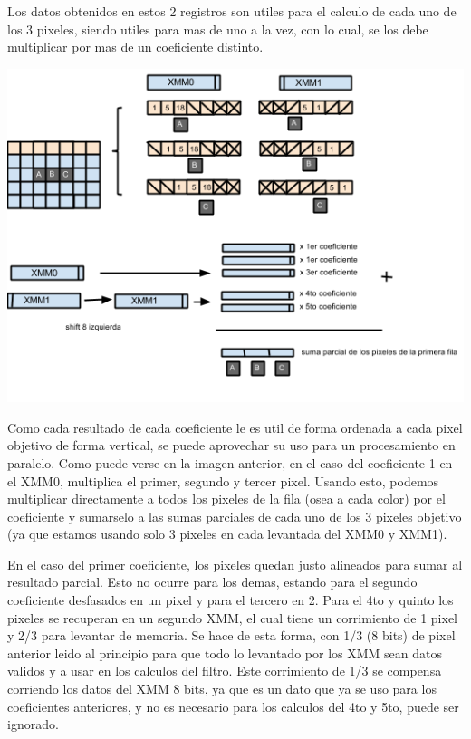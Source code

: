 Los datos obtenidos en estos 2 registros son utiles para el calculo de cada uno de los 3 pixeles, siendo utiles para mas de uno a la vez, con lo cual, se los debe multiplicar por mas de un coeficiente distinto.

\includegraphics[scale=0.8]{imagenes/mini-matriz-descomposicion.png}

Como cada resultado de cada coeficiente le es util de forma ordenada a cada pixel objetivo de forma vertical, se puede aprovechar su uso para un procesamiento en paralelo. Como puede verse en la imagen anterior, en el caso del coeficiente 1 en el XMM0, multiplica el primer, segundo y tercer pixel. Usando esto, podemos multiplicar directamente a todos los pixeles de la fila (osea a cada color) por el coeficiente y sumarselo a las sumas parciales de cada uno de los 3 pixeles objetivo (ya que estamos usando solo 3 pixeles en cada levantada del XMM0 y XMM1).

En el caso del primer coeficiente, los pixeles quedan justo alineados para sumar al resultado parcial. Esto no ocurre para los demas, estando para el segundo coeficiente desfasados en un pixel y para el tercero en 2. Para el 4to y quinto los pixeles se recuperan en un segundo XMM, el cual tiene un corrimiento de 1 pixel y 2/3 para levantar de memoria. Se hace de esta forma, con 1/3 (8 bits) de pixel anterior leido al principio para que todo lo levantado por los XMM sean datos validos y a usar en los calculos del filtro. Este corrimiento de 1/3 se  compensa corriendo los datos del XMM 8 bits, ya que es un dato que ya se uso para los coeficientes anteriores, y no es necesario para los calculos del 4to y 5to, puede ser ignorado.

